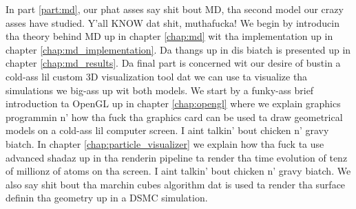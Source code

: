 In part \ref{part:md}, our phat asses say shit bout MD, tha second model our crazy asses have studied. Y'all KNOW dat shit, muthafucka! We begin by introducin tha theory behind MD up in chapter \ref{chap:md} wit tha implementation up in chapter \ref{chap:md_implementation}. Da thangs up in dis biatch is presented up in chapter \ref{chap:md_results}. Da final part is concerned wit our desire of bustin a cold-ass lil custom 3D visualization tool dat we can use ta visualize tha simulations we big-ass up wit both models. We start by a funky-ass brief introduction ta OpenGL up in chapter \ref{chap:opengl} where we explain graphics programmin n' how tha fuck tha graphics card can be used ta draw geometrical models on a cold-ass lil computer screen. I aint talkin' bout chicken n' gravy biatch. In chapter \ref{chap:particle_visualizer} we explain how tha fuck ta use advanced shadaz up in tha renderin pipeline ta render tha time evolution of tenz of millionz of atoms on tha screen. I aint talkin' bout chicken n' gravy biatch. We also say shit bout tha marchin cubes algorithm dat is used ta render tha surface definin tha geometry up in a DSMC simulation.